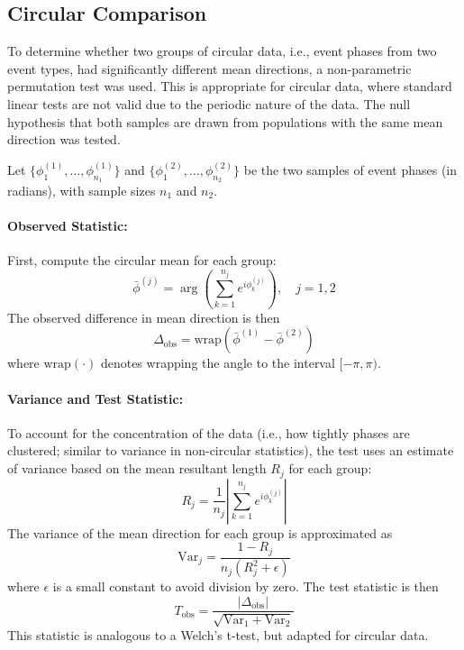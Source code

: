 \subsection{Circular Comparison} \label{subsec:circular-comparison}
To determine whether two groups of circular data, i.e., event phases from two event types, had significantly different mean directions, a non-parametric permutation test was used.
This is appropriate for circular data, where standard linear tests are not valid due to the periodic nature of the data.
The null hypothesis that both samples are drawn from populations with the same mean direction was tested.

Let $\{\phi_1^{(1)}, \ldots, \phi_{n_1}^{(1)}\}$ and $\{\phi_1^{(2)}, \ldots, \phi_{n_2}^{(2)}\}$ be the two samples of event phases (in radians), with sample sizes $n_1$ and $n_2$.

\paragraph{Observed Statistic:}
First, compute the circular mean for each group:
\begin{equation} \label{eq:circ-mean}
    \bar{\phi}^{(j)} = \arg\left( \sum_{k=1}^{n_j} e^{i \phi_k^{(j)}} \right), \quad j=1,2
\end{equation}
The observed difference in mean direction is then
\begin{equation} \label{eq:delta-obs}
    \Delta_{\text{obs}} = \mathrm{wrap}(\bar{\phi}^{(1)} - \bar{\phi}^{(2)})
\end{equation}
where $\mathrm{wrap}(\cdot)$ denotes wrapping the angle to the interval $[-\pi, \pi)$.

\paragraph{Variance and Test Statistic:}
To account for the concentration of the data (i.e., how tightly phases are clustered; similar to variance in non-circular statistics), the test uses an estimate of variance based on the mean resultant length $R_j$ for each group:
\begin{equation} \label{eq:mean-resultant-length}
    R_j = \frac{1}{n_j} \left| \sum_{k=1}^{n_j} e^{i \phi_k^{(j)}} \right|
\end{equation}
The variance of the mean direction for each group is approximated as
\begin{equation} \label{eq:var-mean-dir}
    \mathrm{Var}_j = \frac{1 - R_j}{n_j (R_j^2 + \epsilon)}
\end{equation}
where $\epsilon$ is a small constant to avoid division by zero.
The test statistic is then
\begin{equation} \label{eq:circ-tstat}
    T_{\text{obs}} = \frac{|\Delta_{\text{obs}}|}{\sqrt{\mathrm{Var}_1 + \mathrm{Var}_2}}
\end{equation}
This statistic is analogous to a Welch's t-test, but adapted for circular data.

